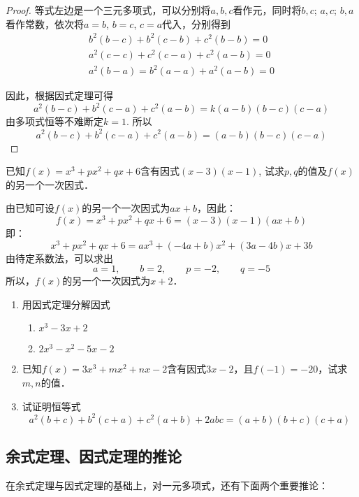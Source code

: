\begin{proof}
等式左边是一个三元多项式，可以分别将$a,b,c$看作元，同时将$b,c$; $a,c$; $b,a$看作常数，依次将$a=b$, $b=c$, $c=a$代入，分别得到
\[\begin{split}
   b^2 (b-c) +b^2 (c-b) +c^2 (b-b) =0\\
   a^2 (c-c) +c^2 (c-a) +c^2 (a-b) =0\\
a^2(b-a)= b^2(a-a) + a^2(a-b) =0 
\end{split}\]

因此，根据因式定理可得
\[a^2 (b-c) +b^2 (c-a) +c^2 (a-b)=k (a-b) (b-c)(c-a)\]
由多项式恒等不难断定$k=1$. 所以
\[a^2 (b-c) +b^2 (c-a) +c^2 (a-b)
= (a-b) (b-c)(c-a)\]
\end{proof}

\begin{example}
    已知$f(x)=x^3+px^2+qx+6$含有因式$(x-3)(x-1)$, 试求$p,q$的值及$f(x)$的另一个一次因式．
\end{example}

\begin{solution}
    由已知可设$f(x)$的另一个一次因式为$ax+b$，因此：
\[f(x)=x^3+px^2+qx+6=(x-3)(x-1)(ax+b)\]
即：
\[x^3+px^2+qx+6=ax^3+(-4a+b)x^2+(3a-4b)x+3b\]
由待定系数法，可以求出
\[a=1,\qquad b=2,\qquad p=-2,\qquad q=-5\]
所以，$f(x)$的另一个一次因式为$x+2$．
\end{solution}

\begin{ex}
\begin{enumerate}
    \item 用因式定理分解因式
\begin{multicols}{2}
\begin{enumerate}
    \item $x^3-3x+2$
    \item $2x^3-x^2-5x-2$
\end{enumerate}
\end{multicols}
    \item 已知$f(x)=3x^3+mx^2+nx-2$含有因式$3x-2$，且$f(-1)=-20$，试求$m,n$的值．
    \item 试证明恒等式
\[a^2(b+c)+b^2(c+a)+c^2(a+b)+2abc=(a+b)(b+c)(c+a)\]
\end{enumerate}  
\end{ex}

\subsection{余式定理、因式定理的推论}

在余式定理与因式定理的基础上，对一元多项式，还有下面两个重要推论：

